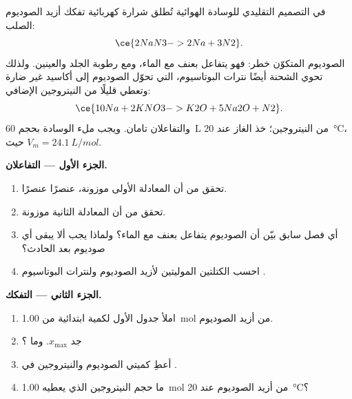 \begin{problem}
\label{pb:g10:reaction-progress-table:1}
في التصميم التقليدي للوسادة الهوائية تُطلق شرارة كهربائية تفكك أزيد الصوديوم
الصلب:
\[
  \ce{2NaN3 -> 2Na + 3N2} .
\]
 الصوديوم المتكوّن خطر: فهو يتفاعل بعنف مع الماء، ومع رطوبة الجلد
والعينين. ولذلك تحوي الشحنة أيضًا نترات البوتاسيوم، التي تحوّل الصوديوم إلى
أكاسيد غير ضارة وتعطي قليلًا من النيتروجين
الإضافي:
\[
  \ce{10Na + 2KNO3 -> K2O + 5Na2O + N2} .
\]
والتفاعلان تامان. ويجب ملء الوسادة بحجم \qty{60}{L} من
النيتروجين؛ خذ الغاز عند \qty{20}{\celsius}، حيث
$V_m = \qty{24.1}{L/mol}$.

\medskip
\noindent\textbf{الجزء الأول --- التفاعلان.}
\begin{enumerate}
  \item تحقق من أن المعادلة الأولى موزونة، عنصرًا عنصرًا.
  \item تحقق من أن المعادلة الثانية موزونة.
  \item أي فصل سابق بيّن أن الصوديوم يتفاعل بعنف مع الماء؟ ولماذا يجب
        ألا يبقى أي صوديوم بعد الحادث؟
  \item احسب الكتلتين الموليتين لأزيد الصوديوم  ولنترات
        البوتاسيوم .
\end{enumerate}

\medskip
\noindent\textbf{الجزء الثاني --- التفكك.}
\begin{enumerate}[resume]
  \item املأ جدول  الأول لكمية ابتدائية من
        \qty{1.00}{mol} من أزيد الصوديوم.
  \item جد $x_{\max}$. وما ؟
  \item أعطِ كميتي الصوديوم والنيتروجين في .
  \item ما حجم النيتروجين الذي يعطيه \qty{1.00}{mol} من أزيد الصوديوم
        عند \qty{20}{\celsius}؟
\end{enumerate}


\end{problem}
